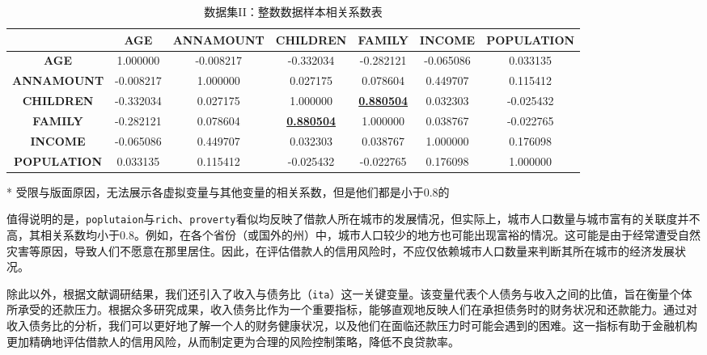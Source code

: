 \documentclass[13.5pt,hyperref,a4paper,UTF8]{ctexart}
\begin{document}
\begin{table}
    \setlength{\belowcaptionskip}{0.2cm}
    \centering
    \caption{数据集II：整数数据样本相关系数表}
    \begin{threeparttable}
    \begin{tabular}{|c|c|c|c|c|c|c|}
    \hline
        \textbf{ } & \textbf{AGE} & \textbf{ANNAMOUNT} & \textbf{CHILDREN} & \textbf{FAMILY} & \textbf{INCOME} & \textbf{POPULATION} \\ \hline
        \textbf{AGE} &  1.000000 & -0.008217 & -0.332034 & -0.282121 & -0.065086 &  0.033135 \\ 
        \textbf{ANNAMOUNT} & -0.008217 &  1.000000 &  0.027175 &  0.078604 &  0.449707 &  0.115412 \\ 
        \textbf{CHILDREN} & -0.332034 &  0.027175 &  1.000000 &  \textbf{\underline{0.880504}} &  0.032303 & -0.025432 \\ 
        \textbf{FAMILY} & -0.282121 &  0.078604 & \textbf{ \underline{0.880504}} &  1.000000 &  0.038767 & -0.022765 \\ 
        \textbf{INCOME} & -0.065086 &  0.449707 &  0.032303 &  0.038767 &  1.000000 &  0.176098 \\ 
        \textbf{POPULATION} &  0.033135 &  0.115412 & -0.025432 & -0.022765 &  0.176098 &  1.000000 \\ \hline
    \end{tabular}
    \label{整数数据样本相关系数表（数据集1）}
    \begin{tablenotes}
        \footnotesize
        \item[*] 受限与版面原因，无法展示各虚拟变量与其他变量的相关系数，但是他们都是小于0.8的  %

      \end{tablenotes}
    \end{threeparttable}
\end{table}



值得说明的是，\texttt{poplutaion}与\texttt{rich}、\texttt{proverty}看似均反映了借款人所在城市的发展情况，但实际上，城市人口数量与城市富有的关联度并不高，其相关系数均小于0.8。例如，在各个省份（或国外的州）中，城市人口较少的地方也可能出现富裕的情况。这可能是由于经常遭受自然灾害等原因，导致人们不愿意在那里居住。因此，在评估借款人的信用风险时，不应仅依赖城市人口数量来判断其所在城市的经济发展状况。

除此以外，根据文献调研结果，我们还引入了收入与债务比（\texttt{ita}）这一关键变量。该变量代表个人债务与收入之间的比值，旨在衡量个体所承受的还款压力。根据众多研究成果，收入债务比作为一个重要指标，能够直观地反映人们在承担债务时的财务状况和还款能力。通过对收入债务比的分析，我们可以更好地了解一个人的财务健康状况，以及他们在面临还款压力时可能会遇到的困难。这一指标有助于金融机构更加精确地评估借款人的信用风险，从而制定更为合理的风险控制策略，降低不良贷款率。
\end{document}
